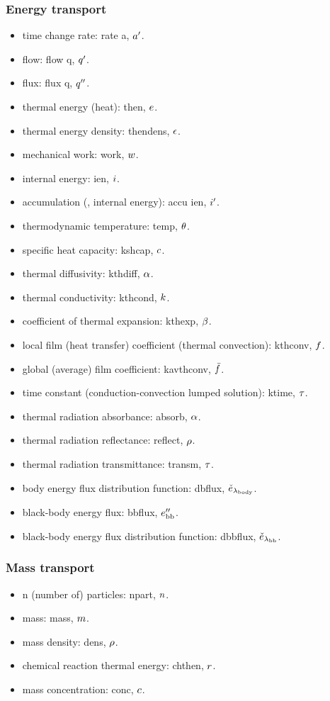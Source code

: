 \subsubsection{Energy transport}
\begin{itemize}
\item time change rate: rate a, ${a}^{\prime}$.
\item flow: flow q, ${q}^{\prime}$.
\item flux: flux q, ${q}^{\prime\prime}$.
\item thermal energy (heat): then, $e$.
\item thermal energy density: thendens, $\epsilon$.
\item mechanical work: work, $w$.
\item internal energy: ien, $i$.
\item accumulation (\eg, internal energy): accu ien, ${i}^{\prime}$.
\item thermodynamic temperature: temp, $\theta$.
\item specific heat capacity: kshcap, $c$.
\item thermal diffusivity: kthdiff, $\alpha$.
\item thermal conductivity: kthcond, $k$.
\item coefficient of thermal expansion: kthexp, $\beta$.
\item local film (heat transfer) coefficient (thermal convection): kthconv, $f$.
\item global (average) film coefficient: kavthconv, $\bar{f}$.
\item time constant (conduction-convection lumped solution): ktime, $\tau$.
\item thermal radiation absorbance: absorb, $\alpha$.
\item thermal radiation reflectance: reflect, $\rho$.
\item thermal radiation transmittance: transm, $\tau$.
\item body energy flux distribution function: dbflux, $\check{e}_{\lambda_\text{body}}$.
\item black-body energy flux: bbflux, ${e}^{\prime\prime}_\text{bb}$.
\item black-body energy flux distribution function: dbbflux, $\check{e}_{\lambda_\text{bb}}$.
\end{itemize}


\subsubsection{Mass transport}
\begin{itemize}
\item n (number of) particles: npart, $n$.
\item mass: mass, $m$.
\item mass density: dens, $\rho$.
\item chemical reaction thermal energy: chthen, $r$.
\item mass concentration: conc, $c$.
\end{itemize}

